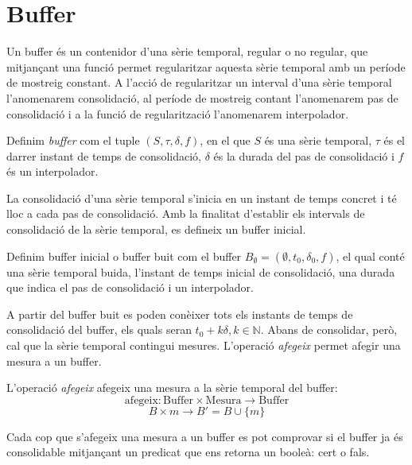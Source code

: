 \section{Buffer}\label{sec:model:buffer}

Un buffer és un contenidor d'una sèrie temporal, regular o no regular, que mitjançant una funció permet regularitzar aquesta sèrie temporal amb un període de mostreig constant. A l'acció de regularitzar un interval d'una sèrie temporal l'anomenarem consolidació, al període de mostreig contant l'anomenarem pas de consolidació i a la funció de regularització l'anomenarem interpolador.

\begin{definition}[Buffer]
  Definim \emph{buffer} com el tuple $(S,\tau,\delta,f)$, en el que
  $S$ és una sèrie temporal, $\tau$ és el darrer instant de temps de
  consolidació, $\delta$ és la durada del pas de consolidació i $f$ és
  un interpolador.
\end{definition}

La consolidació d'una sèrie temporal s'inicia en un instant de temps concret i té lloc a cada pas de consolidació. Amb la finalitat d'establir els intervals de consolidació de la sèrie temporal, es defineix un buffer inicial.

\begin{definition}\label{def:buffer_buit}
  Definim buffer inicial o buffer buit com el buffer $B_{\emptyset} =
  (\emptyset,t_0, \delta_0, f)$, el qual
  conté una sèrie temporal buida, l'instant de temps inicial de
  consolidació, una durada que indica el pas de consolidació i un
  interpolador.
\end{definition}

A partir del buffer buit es poden conèixer tots els instants de temps de consolidació del buffer, els quals seran $t_0+k\delta, k\in\mathbb{N}$. 
Abans de consolidar, però, cal que la sèrie temporal contingui mesures. L'operació \emph{afegeix} permet afegir una mesura a un buffer.

\begin{definition}
  L'operació \emph{afegeix} afegeix una mesura a la sèrie temporal del buffer:
  \[
  \text{afegeix}: \text{Buffer} \times \text{Mesura} \longrightarrow \text{Buffer}
  \]
  \[
   B \times m \longrightarrow B'= B \cup \{m\}
   \]
\end{definition}

Cada cop que s'afegeix una mesura a un buffer es pot comprovar si el buffer ja és consolidable mitjançant un predicat que ens retorna un booleà: cert o fals. 

